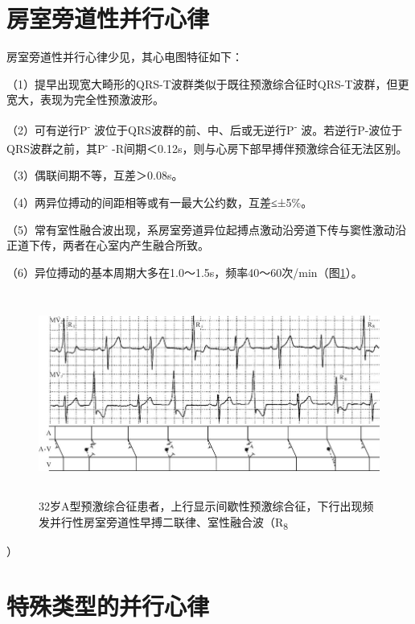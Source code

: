 \protect\hypertarget{text00023.htmlux5cux23subid288}{}{}

\section{房室旁道性并行心律}

房室旁道性并行心律少见，其心电图特征如下：

（1）提早出现宽大畸形的QRS-T波群类似于既往预激综合征时QRS-T波群，但更宽大，表现为完全性预激波形。

（2）可有逆行P\textsuperscript{-}
波位于QRS波群的前、中、后或无逆行P\textsuperscript{-}
波。若逆行P-波位于QRS波群之前，其P\textsuperscript{-}
-R间期＜0.12s，则与心房下部早搏伴预激综合征无法区别。

（3）偶联间期不等，互差＞0.08s。

（4）两异位搏动的间距相等或有一最大公约数，互差≤±5\%。

（5）常有室性融合波出现，系房室旁道异位起搏点激动沿旁道下传与窦性激动沿正道下传，两者在心室内产生融合所致。

（6）异位搏动的基本周期大多在1.0～1.5s，频率40～60次/min（图\ref{fig16-13}）。

\begin{figure}[!htbp]
 \centering
 \includegraphics[width=5.78125in,height=2.625in]{./images/Image00289.jpg}
 \captionsetup{justification=centering}
 \caption{32岁A型预激综合征患者，上行显示间歇性预激综合征，下行出现频发并行性房室旁道性早搏二联律、室性融合波（R\textsubscript{8}}
 \label{fig16-13}
  \end{figure} 
）

\protect\hypertarget{text00023.htmlux5cux23subid289}{}{}

\section{特殊类型的并行心律}


